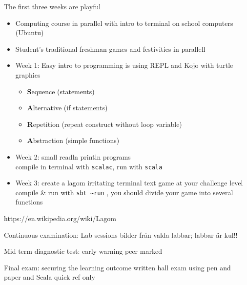 \documentclass[aspectratio=169]{beamer}
\newcommand{\code}{\lstinline[basicstyle=\ttfamily]}
\newenvironment{Slide}[1]%
  {\begin{frame}[environment=Slide]{#1}}
  {\end{frame}}%
\begin{document}
\begin{Slide}{The first three weeks are playful}
  
  \begin{itemize}
    \item Computing course in parallel with intro to terminal on school computers (Ubuntu)
    \item Student's traditional freshman games and festivities in parallell
    \item Week 1: Easy intro to programming is using REPL and Kojo with turtle graphics%
    \begin{itemize}
      \item \textbf{S}equence (statements)
      \item \textbf{A}lternative (if statements)
      \item \textbf{R}epetition (repeat construct without loop variable)
      \item \textbf{A}bstraction (simple functions)   
    \end{itemize}
    \item Week 2: small readln println programs \\ compile in terminal with \code|scalac|, run with \code|scala|
    \item Week 3: create a lagom irritating terminal text game at your challenge level \\ compile \& run with \code|sbt ~run| , you should divide your game into several functions   
  \end{itemize}
\footnotesize{https://en.wikipedia.org/wiki/Lagom}
\end{Slide}  


  


\begin{Slide}{Continuous examination: Lab sessions}
  bilder från valda labbar; labbar är kul!!
\end{Slide}  

\begin{Slide}{Mid term diagnostic test: early warning}
peer marked  
\end{Slide}  


\begin{Slide}{Final exam: securing the learning outcome}
  written hall exam using pen and paper and Scala quick ref only
\end{Slide}  
\end{document}
